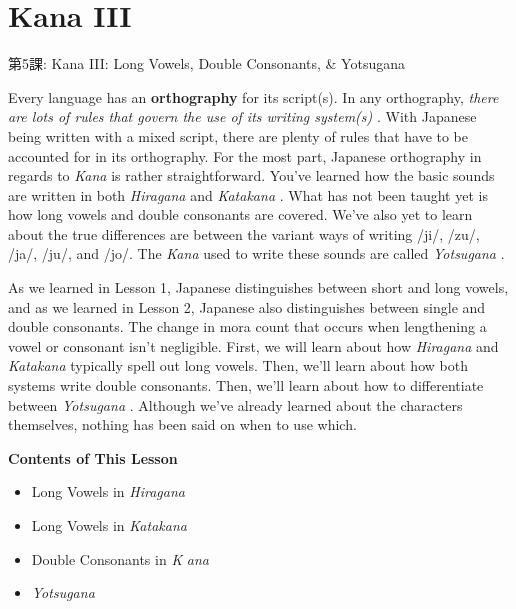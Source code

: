     
\chapter{Kana III}

\begin{center}
\begin{Large}
第5課: Kana III: Long Vowels, Double Consonants, \& Yotsugana 
\end{Large}
\end{center}
 
\par{ Every language has an \textbf{orthography }for its script(s). In any orthography, \emph{there are lots of rules that govern the use of its writing system(s) }. With Japanese being written with a mixed script, there are plenty of rules that have to be accounted for in its orthography. For the most part, Japanese orthography in regards to \emph{Kana }is rather straightforward. You've learned how the basic sounds are written in both \emph{Hiragana }and \emph{Katakana }. What has not been taught yet is how long vowels and double consonants are covered. We've also yet to learn about the true differences are between the variant ways of writing \slash ji\slash , \slash zu\slash , \slash ja\slash , \slash ju\slash , and \slash jo\slash . The \emph{Kana }used to write these sounds are called \emph{Yotsugana }. }

\par{ As we learned in Lesson 1, Japanese distinguishes between short and long vowels, and as we learned in Lesson 2, Japanese also distinguishes between single and double consonants. The change in mora count that occurs when lengthening a vowel or consonant isn't negligible. First, we will learn about how \emph{Hiragana }and \emph{Katakana }typically spell out long vowels. Then, we'll learn about how both systems write double consonants. Then, we'll learn about how to differentiate between \emph{Yotsugana }. Although we've already learned about the characters themselves, nothing has been said on when to use which. }

\begin{center}
\textbf{Contents of This Lesson }
\end{center}

\begin{itemize}

\item Long Vowels in \emph{Hiragana } 
\item Long Vowels in \emph{Katakana } 
\item Double Consonants in \emph{K }\emph{ana } 
\item \emph{Yotsugana  }
\end{itemize}
      
